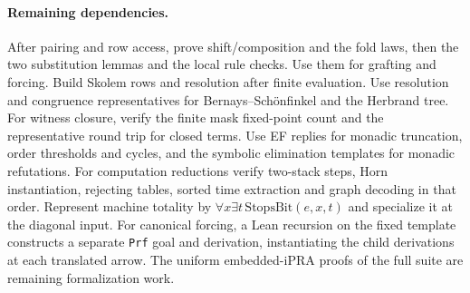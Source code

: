 \paragraph{Remaining dependencies.}
After pairing and row access, prove shift/composition and the fold laws, then the two substitution lemmas and the local rule checks. Use them for grafting and forcing. Build Skolem rows and resolution after finite evaluation. Use resolution and congruence representatives for Bernays--Schönfinkel and the Herbrand tree. For witness closure, verify the finite mask fixed-point count and the representative round trip for closed terms. Use EF replies for monadic truncation, order thresholds and cycles, and the symbolic elimination templates for monadic refutations. For computation reductions verify two-stack steps, Horn instantiation, rejecting tables, sorted time extraction and graph decoding in that order. Represent machine totality by $\forall x\exists t\,\mathrm{StopsBit}(e,x,t)$ and specialize it at the diagonal input. For canonical forcing, a Lean recursion on the fixed template constructs a separate \texttt{Prf} goal and derivation, instantiating the child derivations at each translated arrow. The uniform embedded-iPRA proofs of the full suite are remaining formalization work.
